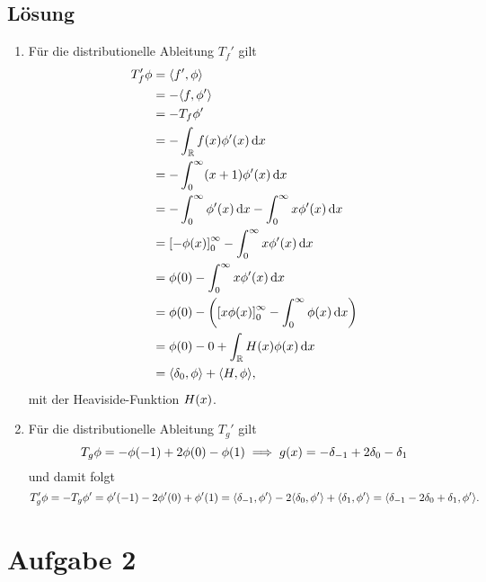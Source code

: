 \documentclass{exercise}
\begin{document}
    \subsection*{Lösung}
    \begin{enumerate}
        \item Für die distributionelle Ableitung \(T_f'\) gilt
        \begin{align*}
            T_f'\phi &= \angles*{f', \phi}\\
            &= -\angles*{f, \phi'}\\
            &= -T_f \phi'\\
            &= -\int_\R f\parentheses*{x}\phi'\parentheses*{x}\d x\\
            &= -\int_0^\infty \parentheses*{x + 1}\phi'\parentheses*{x}\d x\\
            &= -\int_0^\infty \phi'\parentheses*{x}\d x - \int_0^\infty x\phi'\parentheses*{x}\d x\\
            &= \brackets*{-\phi\parentheses*{x}}_0^\infty - \int_0^\infty x\phi'\parentheses*{x}\d x\\
            &= \phi\parentheses*{0} - \int_0^\infty x\phi'\parentheses*{x}\d x\\
            &= \phi\parentheses*{0} - \parentheses*{\brackets*{x\phi\parentheses*{x}}_0^\infty - \int_0^\infty \phi\parentheses*{x}\d x}\\
            &= \phi\parentheses*{0} - 0 + \int_\R H\parentheses*{x}\phi\parentheses*{x}\d x\\
            &= \angles*{\delta_0, \phi} + \angles*{H, \phi},
        \end{align*}
        mit der Heaviside-Funktion \(H\parentheses*{x}\).
        \item Für die distributionelle Ableitung \(T_g'\) gilt
        \[
            T_g \phi = -\phi\parentheses*{-1} + 2\phi\parentheses*{0} - \phi\parentheses*{1} \implies g\parentheses*{x} = -\delta_{-1} + 2\delta_0 - \delta_1
        \]
        und damit folgt
        \[
            T_g'\phi = -T_g \phi' = \phi'\parentheses*{-1} - 2\phi'\parentheses*{0} + \phi'\parentheses*{1} = \angles*{\delta_{-1}, \phi'} - 2\angles*{\delta_0, \phi'} + \angles*{\delta_1, \phi'} = \angles*{\delta_{-1} - 2\delta_0 + \delta_1, \phi'}.
        \]
    \end{enumerate}


    \section*{Aufgabe 2}
    
\end{document}
